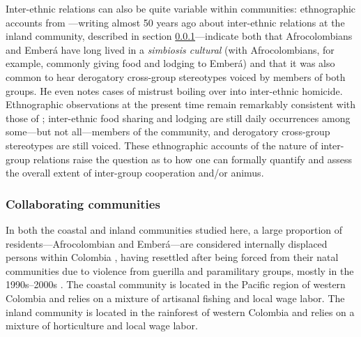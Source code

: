 \documentclass[bibauthoryear]{aa}
\begin{document}
Inter-ethnic relations can also be quite variable within communities: ethnographic accounts from \citet{Cay73}---writing almost 50 years ago about inter-ethnic relations at the inland community, described in section \ref{pops}---indicate both that Afrocolombians and Ember\'a have long lived in a \textit{simbiosis cultural} (with Afrocolombians, for example, commonly giving food and lodging to Ember\'a) and that it was also common to hear derogatory cross-group stereotypes voiced by members of both groups. He even notes cases of mistrust boiling over into inter-ethnic homicide. Ethnographic observations at the present time remain remarkably consistent with those of \citet{Cay73}; inter-ethnic food sharing and lodging are still daily occurrences among some---but not all---members of the community, and derogatory cross-group stereotypes are still voiced. These ethnographic accounts of the nature of inter-group relations raise the question as to how one can formally quantify and assess the overall extent of inter-group cooperation and/or animus. %

\subsubsection{Collaborating communities}\label{pops}
In both the coastal and inland communities studied here, a large proportion of residents---Afrocolombian and Ember\'a---are considered internally displaced persons within Colombia \citep{oyola2015religion, escobar2003displacement}, having resettled after being forced from their natal communities due to violence from guerilla and paramilitary groups, mostly in the 1990s--2000s \citep{ibanez2009forced}. The coastal community is located in the Pacific region of western Colombia and relies on a mixture of artisanal fishing and local wage labor.  The inland community is located in the rainforest of western Colombia and relies on a mixture of horticulture and local wage labor.
\end{document}
